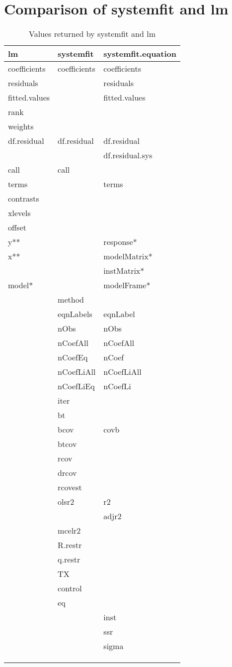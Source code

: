 \section{Comparison of systemfit and lm}

\begin{table}[htbp]
\caption{Values returned by systemfit and lm}
\begin{tabular}{lll}
\hline
lm & systemfit & systemfit.equation \\
\hline
coefficients & coefficients & coefficients \\
residuals & & residuals \\
fitted.values & & fitted.values \\
rank & & \\
weights & & \\
df.residual & df.residual & df.residual \\
 & & df.residual.sys \\
call & call & \\
terms & & terms \\
contrasts & & \\
xlevels & & \\
offset & & \\
y** & & response* \\
x** & & modelMatrix* \\
 & & instMatrix* \\
model* & & modelFrame* \\
 & method & \\
 & eqnLabels & eqnLabel \\
 & nObs & nObs \\
 & nCoefAll & nCoefAll \\
 & nCoefEq & nCoef \\
 & nCoefLiAll & nCoefLiAll \\
 & nCoefLiEq & nCoefLi \\
 & iter & \\
 & bt & \\
 & bcov & covb \\
 & btcov & \\
 & rcov & \\
 & drcov & \\
 & rcovest & \\
 & olsr2 & r2 \\
 &  & adjr2 \\
 & mcelr2 & \\
 & R.restr & \\
 & q.restr & \\
 & TX & \\
 & control & \\
 & eq & \\
 & & inst \\
 & & ssr \\
 & & sigma \\
 & & \\
 & & \\
 & & \\
\hline
\end{tabular}
\end{table}
